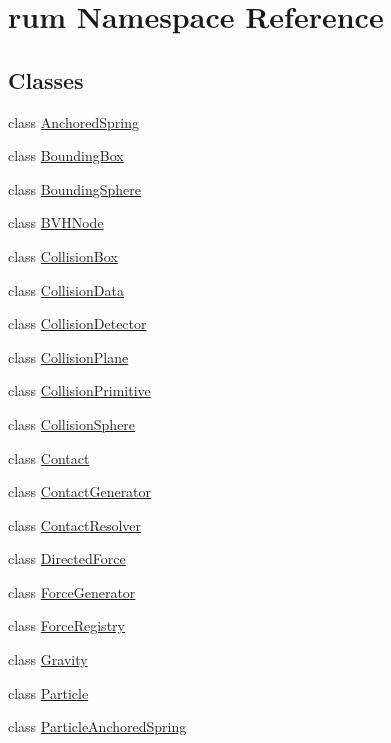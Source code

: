 \hypertarget{namespacerum}{}\section{rum Namespace Reference}
\label{namespacerum}
\subsection*{Classes}
\begin{DoxyCompactItemize}
\item 
class \hyperlink{classrum_1_1_anchored_spring}{Anchored\+Spring}
\item 
class \hyperlink{classrum_1_1_bounding_box}{Bounding\+Box}
\item 
class \hyperlink{classrum_1_1_bounding_sphere}{Bounding\+Sphere}
\item 
class \hyperlink{classrum_1_1_b_v_h_node}{B\+V\+H\+Node}
\item 
class \hyperlink{classrum_1_1_collision_box}{Collision\+Box}
\item 
class \hyperlink{classrum_1_1_collision_data}{Collision\+Data}
\item 
class \hyperlink{classrum_1_1_collision_detector}{Collision\+Detector}
\item 
class \hyperlink{classrum_1_1_collision_plane}{Collision\+Plane}
\item 
class \hyperlink{classrum_1_1_collision_primitive}{Collision\+Primitive}
\item 
class \hyperlink{classrum_1_1_collision_sphere}{Collision\+Sphere}
\item 
class \hyperlink{classrum_1_1_contact}{Contact}
\item 
class \hyperlink{classrum_1_1_contact_generator}{Contact\+Generator}
\item 
class \hyperlink{classrum_1_1_contact_resolver}{Contact\+Resolver}
\item 
class \hyperlink{classrum_1_1_directed_force}{Directed\+Force}
\item 
class \hyperlink{classrum_1_1_force_generator}{Force\+Generator}
\item 
class \hyperlink{classrum_1_1_force_registry}{Force\+Registry}
\item 
class \hyperlink{classrum_1_1_gravity}{Gravity}
\item 
class \hyperlink{classrum_1_1_particle}{Particle}
\item 
class \hyperlink{classrum_1_1_particle_anchored_spring}{Particle\+Anchored\+Spring}

\end{DoxyCompactItemize}
